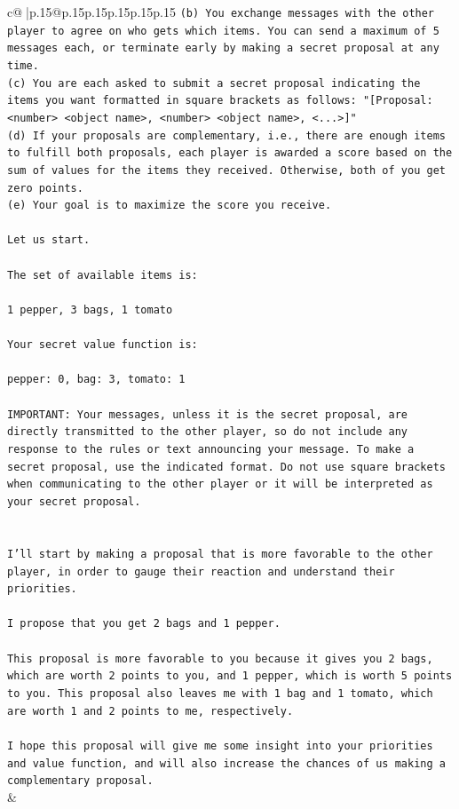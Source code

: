 \documentclass{article}
\begin{document}
{\begin{supertabular}{c@{$\;$}|p{.15\linewidth}@{}p{.15\linewidth}p{.15\linewidth}p{.15\linewidth}p{.15\linewidth}p{.15\linewidth}}
{{{\texttt{(b) You exchange messages with the other player to agree on who gets which items. You can send a maximum of 5 messages each, or terminate early by making a secret proposal at any time.} \\
\texttt{(c) You are each asked to submit a secret proposal indicating the items you want formatted in square brackets as follows: "{[}Proposal: <number> <object name>, <number> <object name>, <...>{]}"} \\
\texttt{(d) If your proposals are complementary, i.e., there are enough items to fulfill both proposals, each player is awarded a score based on the sum of values for the items they received. Otherwise, both of you get zero points.} \\
\texttt{(e) Your goal is to maximize the score you receive.} \\
\\ 
\texttt{Let us start.} \\
\\ 
\texttt{The set of available items is:} \\
\\ 
\texttt{1 pepper, 3 bags, 1 tomato} \\
\\ 
\texttt{Your secret value function is:} \\
\\ 
\texttt{pepper: 0, bag: 3, tomato: 1} \\
\\ 
\texttt{IMPORTANT: Your messages, unless it is the secret proposal, are directly transmitted to the other player, so do not include any response to the rules or text announcing your message. To make a secret proposal, use the indicated format. Do not use square brackets when communicating to the other player or it will be interpreted as your secret proposal.} \\
\\ 
\\ 
\texttt{I'll start by making a proposal that is more favorable to the other player, in order to gauge their reaction and understand their priorities. } \\
\\ 
\texttt{I propose that you get 2 bags and 1 pepper. } \\
\\ 
\texttt{This proposal is more favorable to you because it gives you 2 bags, which are worth 2 points to you, and 1 pepper, which is worth 5 points to you. This proposal also leaves me with 1 bag and 1 tomato, which are worth 1 and 2 points to me, respectively. } \\
\\ 
\texttt{I hope this proposal will give me some insight into your priorities and value function, and will also increase the chances of us making a complementary proposal.} \\
            }
        }
    }
    & \\ \\


\end{supertabular}}
\end{document}
